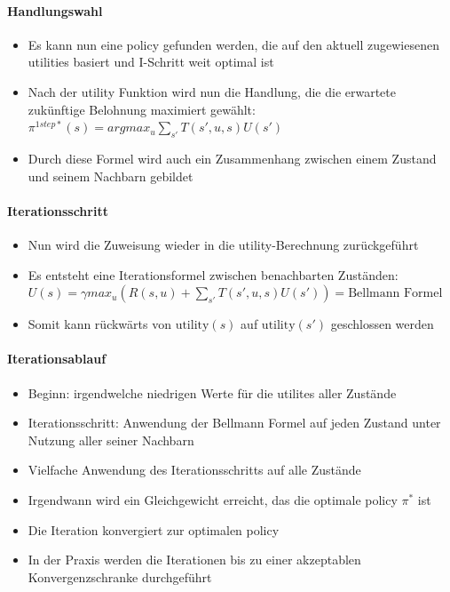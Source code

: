 \paragraph{Handlungswahl}
\begin{itemize}
	\item Es kann nun eine policy gefunden werden, die auf den aktuell zugewiesenen utilities basiert und I-Schritt weit optimal ist
	\item Nach der utility Funktion wird nun die Handlung, die die erwartete zuk\"unftige Belohnung maximiert gew\"ahlt: $\pi^{1step*}(s) = argmax_u \sum_{s'} T(s', u, s) U(s')$
	\item Durch diese Formel wird auch ein Zusammenhang zwischen einem Zustand und seinem Nachbarn gebildet
\end{itemize}

\paragraph{Iterationsschritt}
\begin{itemize}
	\item Nun wird die Zuweisung wieder in die utility-Berechnung zur\"uckgef\"uhrt
	\item Es entsteht eine Iterationsformel zwischen benachbarten Zust\"anden:
	$U(s) = \gamma max_u (R(s,u) + \sum_{s'} T(s', u, s) U(s')) = \text{Bellmann Formel}$
	\item Somit kann r\"uckw\"arts von $\text{utility}(s)$ auf $\text{utility}(s')$ geschlossen werden
\end{itemize}

\paragraph{Iterationsablauf}
\begin{itemize}
	\item Beginn: irgendwelche niedrigen Werte f\"ur die utilites aller Zust\"ande
	\item Iterationsschritt: Anwendung der Bellmann Formel auf jeden Zustand unter Nutzung aller seiner Nachbarn
	\item Vielfache Anwendung des Iterationsschritts auf alle Zust\"ande
	\item Irgendwann wird ein Gleichgewicht erreicht, das die optimale policy $\pi^*$ ist
	\item Die Iteration konvergiert zur optimalen policy
	\item In der Praxis werden die Iterationen bis zu einer akzeptablen Konvergenzschranke durchgef\"uhrt
\end{itemize}

